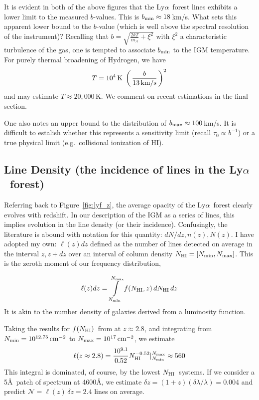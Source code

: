 \documentclass[graybox]{svmult}
\newcommand{\HI}{H{\sc I}}
\def\lya{Ly$\alpha$}
\def\ltp{\left ( \,}
\def\rtp{\, \right  ) }
\def\intl{\int\limits}
\newcommand{\mnhi}{N_{\rm HI}}
\newcommand{\nhi}{$\mnhi$}
\def\cm#1{\, {\rm cm^{#1}}}
\def\mfnhi{f(\mnhi)}
\def\fnhi{$\mfnhi$}
\begin{document}
It is evident in both of the above figures that the
\lya\ forest lines exhibits a lower limit to the 
measured $b$-values.  This is  $b_{\rm min} \approx 18$\,km/s.
What sets this apparent lower bound to the $b$-value (which is 
well above the spectral resolution of the instrument)?
Recalling that $b = \sqrt{\frac{2kT}{m_A} + \xi^2}$
with $\xi^2$ a characteristic turbulence of the gas,
one is tempted to associate $b_{\rm min}$ to the IGM temperature.
For purely thermal broadening of Hydrogen, we have
\begin{equation}
T = 10^4 \, {\rm K} \; \ltp \frac{b}{13 \, \rm km/s} \rtp^2
\end{equation}
and may estimate $T \approx 20,000$\,K.
We comment on recent estimations in the final section.

One also notes an upper bound to the distribution
of $b_{\rm max} \approx 100$\,km/s.
It is difficult to estalish whether this represents
a sensitivity limit (recall $\tau_0 \propto b^{-1}$)
or a true physical limit (e.g.\ collisional ionization
of \HI).

\subsection{Line Density (the incidence of lines in the \lya\ forest)}

Referring back to Figure~\ref{fig:lyf_z}, the average 
opacity of the \lya\ forest clearly evolves with redshift.
In our description of the IGM as a series of lines, this
implies evolution in the line density (or their incidence).
Confusingly, the literature is abound with notation for
this quantity: $dN/dz, n(z), N(z)$.
I have adopted my own:  $\ell(z) dz $ defined as the
number of lines detected on average in the interval 
$z, z+dz$ over an interval of 
column density $\mnhi = [N_{\rm min}, N_{\rm max}]$.
This is the zeroth moment of our frequency distribution,

\begin{equation}
\ell(z) dz = \intl_{N_{\rm min}}^{N_{\rm max}} f(\mnhi,z) \, d\mnhi \, dz
\label{eqn:loz}
\end{equation}
It is akin to the number density of galaxies derived from a 
luminosity function.

Taking the results for \fnhi\ from \cite{kim13} at $z \approx 2.8$,
and integrating from $N_{\rm min} = 10^{12.75} \cm{-2}$
to $N_{\rm max} = 10^{17} \cm{-2}$, we estimate
\begin{equation}
\ell(z \approx 2.8) = \frac{10^{9.1}}{0.52} \mnhi^{-0.52} 
|_{N_{\rm min}}^{N_{\rm max}} \approx 560
\end{equation}
This integral is dominated, of course, by the lowest 
\nhi\ systems.  If we consider a 5\AA\ patch of spectrum at 4600\AA,
we estimate $\delta z = (1+z) (\delta\lambda/\lambda) = 0.004$
and predict $\mathcal{N} = \ell(z) \, \delta z = 2.4$ lines
on average.
\end{document}

